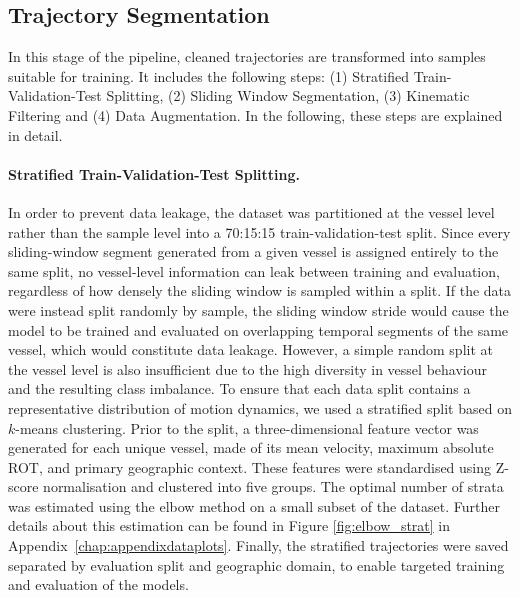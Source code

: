 \subsection{Trajectory Segmentation}

In this stage of the pipeline, cleaned trajectories are transformed into samples suitable for training. 
It includes the following steps: (1) Stratified Train-Validation-Test Splitting, (2) Sliding Window Segmentation, (3) Kinematic Filtering and (4) Data Augmentation.
In the following, these steps are explained in detail. 


\paragraph{Stratified Train-Validation-Test Splitting.}
\label{subsubsec:stratifiedtvtsplit}
In order to prevent data leakage, the dataset was partitioned at the vessel level rather than the sample level into a 70:15:15 train-validation-test split.
 Since every sliding-window segment %
 generated from a given vessel is assigned entirely to the same split, no vessel-level information can leak between training and evaluation, regardless of how densely the sliding window is sampled within a split.
If the data were instead split randomly by sample, the sliding window stride would cause the model to be trained and evaluated on overlapping temporal segments of the same vessel, which would constitute data leakage.
However, a simple random split at the vessel level is also insufficient due to the high diversity in vessel behaviour and the resulting class imbalance.
To ensure that each data split contains a representative distribution of motion dynamics, we used a stratified split based on $k$-means clustering.
Prior to the split, a three-dimensional feature vector was generated for each unique vessel, made of its mean velocity, maximum absolute \ac{ROT}, and primary geographic context.
These features were standardised using Z-score normalisation and clustered into five groups. The optimal number of strata was estimated using the elbow method on a small subset of the dataset. Further details about this estimation can be found in Figure \ref{fig:elbow_strat} in Appendix~\ref{chap:appendixdataplots}.
Finally, the stratified trajectories were saved separated by evaluation split and geographic domain, to enable targeted training and evaluation of the models.

